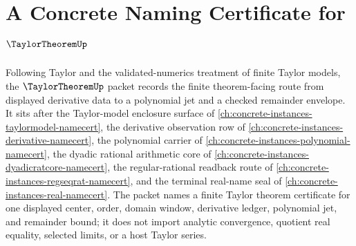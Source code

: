 \chapter{A Concrete Naming Certificate for $\TaylorTheoremUp$}
\label{ch:concrete-instances-taylor-theorem-namecert}

Following Taylor and the validated-numerics treatment of finite Taylor models, the $\TaylorTheoremUp$ packet records the finite theorem-facing route from displayed derivative data to a polynomial jet and a checked remainder envelope. It sits after the Taylor-model enclosure surface of \autoref{ch:concrete-instances-taylormodel-namecert}, the derivative observation row of \autoref{ch:concrete-instances-derivative-namecert}, the polynomial carrier of \autoref{ch:concrete-instances-polynomial-namecert}, the dyadic rational arithmetic core of \autoref{ch:concrete-instances-dyadicratcore-namecert}, the regular-rational readback route of \autoref{ch:concrete-instances-regseqrat-namecert}, and the terminal real-name seal of \autoref{ch:concrete-instances-real-namecert}. The packet names a finite Taylor theorem certificate for one displayed center, order, domain window, derivative ledger, polynomial jet, and remainder bound; it does not import analytic convergence, quotient real equality, selected limits, or a host Taylor series.

